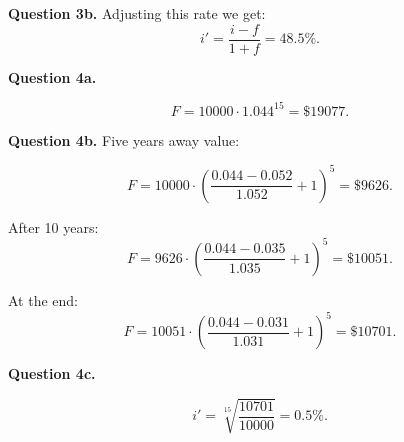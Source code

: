 \documentclass[letterpaper, reqno,11pt]{article}
\begin{document}
{\noindent\bf Question 3b.} Adjusting this rate we get: 
\[
i'=\frac{i-f}{1+f}=48.5\%
.\]

{\noindent\bf Question 4a.} 

\[
F=10000\cdot 1.044^{15}=\$19077
.\]

{\noindent\bf Question 4b.} Five years away value: 

\[
F=10000\cdot (\frac{0.044-0.052}{1.052}+1)^5=\$9626
.\]

After 10 years: 
\[
F=9626\cdot(\frac{0.044-0.035}{1.035}+1)^5=\$10051
.\]

At the end: 
\[
F=10051\cdot(\frac{0.044-0.031}{1.031}+1)^5=\$10701
.\]

{\noindent\bf Question 4c.} 

\[
    i'=\sqrt[15]{\frac{10701}{10000}}=0.5\%
.\]
\end{document}

